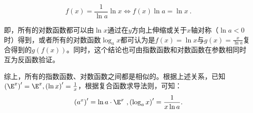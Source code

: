 \begin{equation}
f(x)=\frac{1}{\ln a}\ln x\iff f(x)\ln a=\ln x~.
\end{equation}

即，所有的对数函数都可以由$\ln x$通过在$y$方向上伸缩或关于$x$轴对称（$\ln a<0$时）得到，或者所有的对数函数$\log_ax$都可认为是$f(x)=\ln x$与$\displaystyle g(x)=\frac{x}{\ln a}$复合得到的$g(f(x))$。同时，这个结论也可由指数函数和对数函数在参数相同时互为反函数验证。

综上，所有的指数函数、对数函数之间都是相似的。根据上述关系，已知$\left(\E^x\right)'=\E^x,\left(\ln x\right)'=\frac{1}{x}$，根据复合函数求导法则，可知：
\begin{equation}
\left(a^x\right)'=\ln a\cdot\E^x~,\left(\log_a x\right)'=\frac{1}{x\ln a}.
\end{equation}
